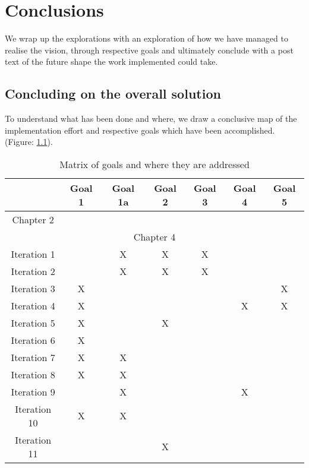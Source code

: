 \chapter{Conclusions}

We wrap up the explorations with an exploration of how we have managed to realise the vision, through respective goals and ultimately conclude with a post text of the future shape the work implemented could take.

\section{Concluding on the overall solution}

To understand what has been done and where, we draw a conclusive map of the implementation effort and respective goals which have been accomplished. (Figure: \ref{table:matrixOfGoalsAndTheirImplementationEffort}). 

\begin{table}[h!]
\centering
\small
	\begin{tabular}{|c|c|c|c|c|c|c|}
		\hline 
		& Goal 1 & Goal 1a & Goal 2 & Goal 3 & Goal 4 & Goal 5 \\ 
		\hline 
		Chapter 2 &  &  &  &  &  &  \\ 
		\hline 
		\multicolumn{7}{|c|}{Chapter 4} \\ 
		\hline 
		Iteration 1 &  & X & X & X &  &  \\ 
		\hline 	
		Iteration 2 &  & X & X & X &  &  \\ 
		\hline 	
		Iteration 3 & X &  &  &  &  & X \\ 
		\hline 
		Iteration 4 & X &  &  &  & X & X \\ 
		\hline 
		Iteration 5 & X &  & X &  &  &  \\ 
		\hline 
		Iteration 6 & X &  &  &  &  &  \\ 
		\hline 
		Iteration 7 & X & X &  &  &  &  \\ 
		\hline 
		Iteration 8 & X & X &  &  &  &  \\ 
		\hline 
		Iteration 9 &  & X &  &  & X &  \\ 
		\hline 
		Iteration 10 & X & X &  &  &  &  \\ 
		\hline 
		Iteration 11 &  &  & X &  &  &  \\ 
		\hline 
	\end{tabular} 
	\caption{Matrix of goals and where they are addressed}
	\label{table:matrixOfGoalsAndTheirImplementationEffort}
\end{table}

